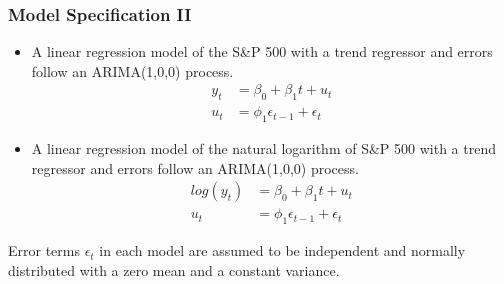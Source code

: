 \begin{frame}
    \frametitle{Model Specification II}

    \begin{itemize}
    \item A linear regression model of the S\&P 500 with a trend regressor and errors follow an ARIMA(1,0,0) process. 
        \begin{align*}
        y_t &= \beta_0 + \beta_1 t + u_t \\
        u_t &= \phi_1 \epsilon_{t-1} + \epsilon_t
        \end{align*}

    \item A linear regression model of the natural logarithm of S\&P 500 with a trend regressor and errors follow an ARIMA(1,0,0) process. 
        \begin{align*}
        log(y_t) &= \beta_0 + \beta_1 t + u_t \\
        u_t &= \phi_1 \epsilon_{t-1} + \epsilon_t
        \end{align*}
    \end{itemize}

Error terms $\epsilon_t$ in each model are assumed to be independent and normally distributed with a zero mean and a constant variance.

\end{frame}



